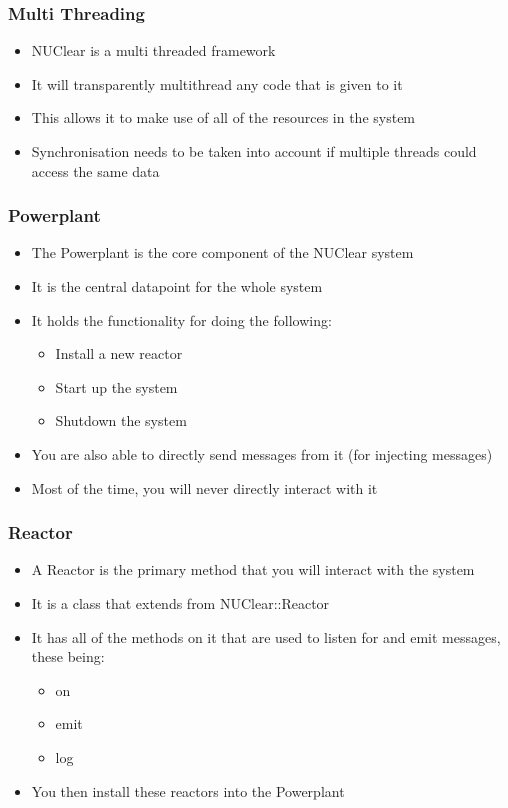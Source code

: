 \documentclass{beamer}
\begin{document}
\begin{frame}
	\frametitle{Multi Threading}
	\begin{itemize}
		\item NUClear is a multi threaded framework
		\item It will transparently multithread any code that is given to it
		\item This allows it to make use of all of the resources in the system
		\item Synchronisation needs to be taken into account if multiple threads could access the same data
	\end{itemize}
\end{frame}

\begin{frame}
	\frametitle{Powerplant}
	\begin{itemize}
		\item The Powerplant is the core component of the NUClear system
		\item It is the central datapoint for the whole system
		\item It holds the functionality for doing the following:
			\begin{itemize}
				\item Install a new reactor
				\item Start up the system
				\item Shutdown the system
			\end{itemize}
		\item You are also able to directly send messages from it (for injecting messages)
		\item Most of the time, you will never directly interact with it
	\end{itemize}
\end{frame}

\begin{frame}
	\frametitle{Reactor}
	\begin{itemize}
		\item A Reactor is the primary method that you will interact with the system
		\item It is a class that extends from NUClear::Reactor
		\item It has all of the methods on it that are used to listen for and emit messages, these being:
			\begin{itemize}
				\item on
				\item emit
				\item log
			\end{itemize}
		\item You then install these reactors into the Powerplant
	\end{itemize}
\end{frame}
\end{document}
